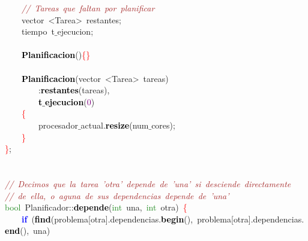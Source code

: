 \mbox{}\ \ \ \ \textit{\textcolor{Brown}{//\ Tareas\ que\ faltan\ por\ planificar}} \\
\mbox{}\ \ \ \ vector\ \textcolor{BrickRed}{\textless{}}Tarea\textcolor{BrickRed}{\textgreater{}}\ restantes\textcolor{BrickRed}{;} \\
\mbox{}\ \ \ \ \textcolor{TealBlue}{tiempo}\ t$\_$ejecucion\textcolor{BrickRed}{;} \\
\mbox{} \\
\mbox{}\ \ \ \ \textbf{\textcolor{Black}{Planificacion}}\textcolor{BrickRed}{()}\textcolor{Red}{\{\}} \\
\mbox{} \\
\mbox{}\ \ \ \ \textbf{\textcolor{Black}{Planificacion}}\textcolor{BrickRed}{(}vector\ \textcolor{BrickRed}{\textless{}}Tarea\textcolor{BrickRed}{\textgreater{}}\ tareas\textcolor{BrickRed}{)} \\
\mbox{}\ \ \ \ \ \ \ \ \textcolor{BrickRed}{:}\textbf{\textcolor{Black}{restantes}}\textcolor{BrickRed}{(}tareas\textcolor{BrickRed}{),} \\
\mbox{}\ \ \ \ \ \ \ \ \textbf{\textcolor{Black}{t$\_$ejecucion}}\textcolor{BrickRed}{(}\textcolor{Purple}{0}\textcolor{BrickRed}{)} \\
\mbox{}\ \ \ \ \textcolor{Red}{\{} \\
\mbox{}\ \ \ \ \ \ \ \ procesador$\_$actual\textcolor{BrickRed}{.}\textbf{\textcolor{Black}{resize}}\textcolor{BrickRed}{(}num$\_$cores\textcolor{BrickRed}{);} \\
\mbox{}\ \ \ \ \textcolor{Red}{\}} \\
\mbox{}\textcolor{Red}{\}}\textcolor{BrickRed}{;} \\
\mbox{} \\
\mbox{} \\
\mbox{}\textit{\textcolor{Brown}{//\ Decimos\ que\ la\ tarea\ 'otra'\ depende\ de\ 'una'\ si\ desciende\ directamente}} \\
\mbox{}\textit{\textcolor{Brown}{//\ de\ ella,\ o\ aguna\ de\ sus\ dependencias\ depende\ de\ 'una'}} \\
\mbox{}\textcolor{ForestGreen}{bool}\ Planificador\textcolor{BrickRed}{::}\textbf{\textcolor{Black}{depende}}\textcolor{BrickRed}{(}\textcolor{ForestGreen}{int}\ una\textcolor{BrickRed}{,}\ \textcolor{ForestGreen}{int}\ otra\textcolor{BrickRed}{)}\ \textcolor{Red}{\{} \\
\mbox{}\ \ \ \ \textbf{\textcolor{Blue}{if}}\ \textcolor{BrickRed}{(}\textbf{\textcolor{Black}{find}}\textcolor{BrickRed}{(}problema\textcolor{BrickRed}{[}otra\textcolor{BrickRed}{].}dependencias\textcolor{BrickRed}{.}\textbf{\textcolor{Black}{begin}}\textcolor{BrickRed}{(),}\ problema\textcolor{BrickRed}{[}otra\textcolor{BrickRed}{].}dependencias\textcolor{BrickRed}{.}\textbf{\textcolor{Black}{end}}\textcolor{BrickRed}{(),}\ una\textcolor{BrickRed}{)} \\
